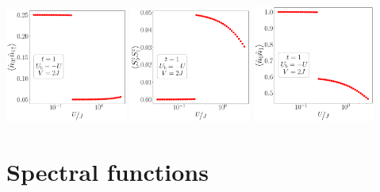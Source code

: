 \documentclass{report}
\numberwithin{equation}{section}
\begin{document}
\begin{center}
	\includegraphics[width=0.3\textwidth]{../figures/r-par-t=1.000,J=31.623,0.000,50,V=2J,Ubath=-U,N=4,U=0.032,3.162,50.pdf}
	\includegraphics[width=0.3\textwidth]{../figures/r-ising-t=1.000,J=31.623,0.000,50,V=2J,Ubath=-U,N=4,U=0.032,3.162,50.pdf}
	\includegraphics[width=0.3\textwidth]{../figures/r-charge-t=1.000,J=31.623,0.000,50,V=2J,Ubath=-U,N=4,U=0.032,3.162,50.pdf}
\end{center}

\section{Spectral functions}
\end{document}
